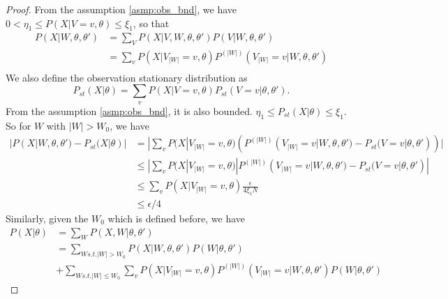 \begin{proof}
From the assumption \ref{asmp:obs_bnd}, we have %
$0 < \eta_1 \leq P(X | V=v, \theta) \leq \xi_1$, so that
\begin{align*}
P(X|W , \theta, \theta') &= \sum_V P(X | V, W, \theta, \theta') P(V | W, \theta, \theta')\\
&= \sum_{v} P(X | V_{|W|}=v, \theta) P^{(|W|)}(V_{|W|}=v | W, \theta, \theta')\\
\end{align*}
 We also define the observation stationary distribution as $$P_{st}(X | \theta) = \sum_{v} P(X | V=v, \theta) P_{st}(V=v | \theta, \theta').$$
 From the assumption \ref{asmp:obs_bnd}, it is also bounded. $\eta_1 \leq P_{st}(X | \theta) \leq \xi_1$.\\
So for $W$ with $|W| > W_0$, we have
\begin{align*}
|P(X|W , \theta, \theta') - P_{st}(X | \theta)| &= | \sum_{v} P(X | V_{|W|}=v, \theta)(P^{(|W|)}(V_{|W|}=v | W, \theta, \theta') -  P_{st}(V=v | \theta, \theta'))|\\
& \leq |\sum_{v} P(X | V_{|W|}=v, \theta)|P^{(|W|)}(V_{|W|}=v | W, \theta, \theta') -  P_{st}(V=v | \theta, \theta')|\\
& \leq \sum_{v} P(X | V_{|W|}=v, \theta)\frac{\epsilon}{4\xi_1N}\\
& \leq \epsilon / 4
\end{align*}
Similarly, given the $W_0$ which is defined before, we have
\begin{align*}
P(X | \theta) &= \sum_W P(X , W | \theta, \theta')\\
&= \sum_{W s.t. |W| > W_0} P(X | W, \theta, \theta') P(W | \theta, \theta') \\
&+ \sum_{W s.t. |W| \leq W_0} \sum_{v} P(X | V_{|W|} = v, \theta) P^{(|W|)}(V_{|W|} = v | W, \theta, \theta') P(W|\theta, \theta')
\end{align*}

\end{proof}
